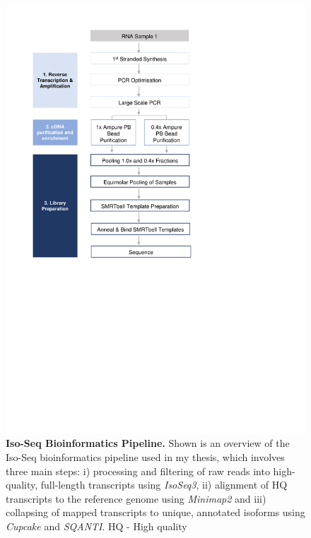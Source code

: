 \begin{figure}[]
	\centering
	\vspace{20pt}
	\includegraphics[page=17,trim={0 6cm 0 0},clip,scale = 0.8]{Figures/ProjectDevelopment_Figures.pdf}
	\captionsetup{width=0.95\textwidth}
	\caption[Iso-Seq Bioinformatics Pipeline]%
	{\textbf{Iso-Seq Bioinformatics Pipeline.} Shown is an overview of the Iso-Seq bioinformatics pipeline used in my thesis, which involves three main steps: i) processing and filtering of raw reads into high-quality, full-length transcripts using \textit{IsoSeq3}, ii) alignment of HQ transcripts to the reference genome using \textit{Minimap2} and iii) collapsing of mapped transcripts to unique, annotated isoforms using \textit{Cupcake} and \textit{SQANTI}. HQ - High quality}
	\label{fig:isoseq_bioinformatics_Pipeline}
\end{figure}

